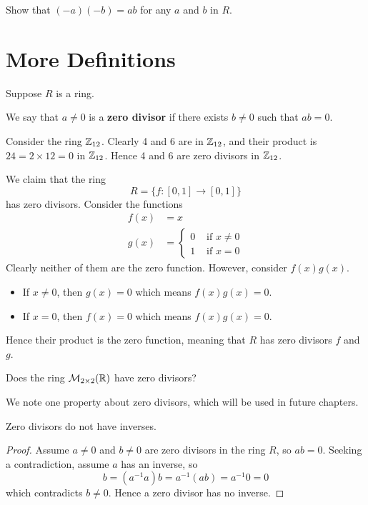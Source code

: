 \begin{exercise}\label{exercise-product-of-additive-inverses}
    Show that $(-a)(-b) = ab$ for any $a$ and $b$ in $R$.
\end{exercise}

\section{More Definitions}
Suppose $R$ is a ring.
\begin{definition}
    We say that $a \neq 0$ is a \textbf{zero divisor} if there exists $b \neq 0$ such that $ab = 0$.
\end{definition}
\begin{example}
    Consider the ring $\mathbb{Z}_{12}$. Clearly 4 and 6 are in $\mathbb{Z}_{12}$, and their product is $24 = 2 \times 12 = 0$ in $\mathbb{Z}_{12}$. Hence 4 and 6 are zero divisors in $\mathbb{Z}_{12}$.
\end{example}
\begin{example}
    We claim that the ring
    \[
        R = \{f: [0, 1] \to [0, 1]\}
    \]
    has zero divisors. Consider the functions
    \begin{align*}
        f(x) &= x\\
        g(x) &= \begin{cases}
            0 & \text{ if } x \neq 0\\
            1 & \text{ if } x = 0
        \end{cases}
    \end{align*}
    Clearly neither of them are the zero function. However, consider $f(x)g(x)$.
    \begin{itemize}
        \item If $x \neq 0$, then $g(x) = 0$ which means $f(x)g(x) = 0$.
        \item If $x = 0$, then $f(x) = 0$ which means $f(x)g(x) = 0$.
    \end{itemize}
    Hence their product is the zero function, meaning that $R$ has zero divisors $f$ and $g$.
\end{example}
\begin{exercise}
    Does the ring $\mathcal{M}_{2\times2}(\mathbb{R})$ have zero divisors?
\end{exercise}
We note one property about zero divisors, which will be used in future chapters.
\begin{proposition}\label{prop-zero-divisors-have-no-inverses}
    Zero divisors do not have inverses.
\end{proposition}
\begin{proof}
    Assume $a \neq 0$ and $b \neq 0$ are zero divisors in the ring $R$, so $ab = 0$. Seeking a contradiction, assume $a$ has an inverse, so
    \[
        b = (a^{-1}a)b = a^{-1}(ab) = a^{-1}0 = 0    
    \]
    which contradicts $b \neq 0$. Hence a zero divisor has no inverse.
\end{proof}

